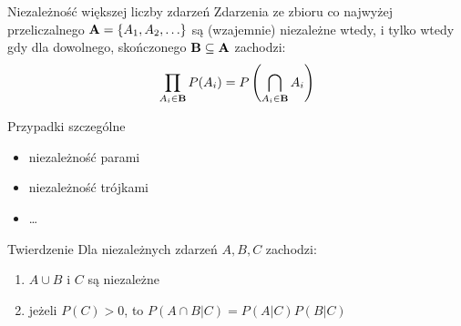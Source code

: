 \documentclass{mp}
\begin{document}
\begin{frame}{Niezależność większej liczby zdarzeń}
Zdarzenia ze zbioru co najwyżej przeliczalnego $\mathbf{A}=\{A_1, A_2, \ldots\}$ są (wzajemnie) niezależne wtedy, i tylko wtedy gdy dla dowolnego, skończonego $\mathbf{B}\subseteq \mathbf{A}$ zachodzi:
\[ \prod_{A_i\in \mathbf{B}} P(A_i)=P\left(\bigcap_{A_i\in \mathbf{B}}A_i\right)\]
{
	\begin{block}{Przypadki szczególne}
	\begin{itemize}
	\item niezależność parami
	\item niezależność trójkami
	\item \ldots
	\end{itemize}
	\end{block}
}
{
	\begin{block}{Twierdzenie}
	Dla niezależnych zdarzeń $A, B, C$ zachodzi:
	\begin{enumerate}
	\item $A\cup B$ i $C$ są niezależne
	\item jeżeli $P(C)>0$, to $P(A\cap B|C)=P(A|C)P(B|C)$
	\end{enumerate}
	\end{block}
}
\end{frame}
\end{document}
